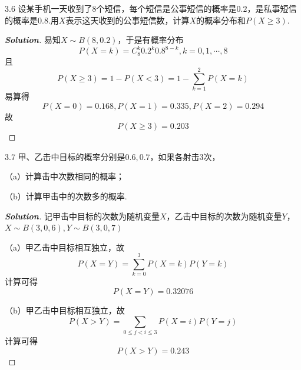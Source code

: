 \documentclass[10pt, a4paper, oneside]{ctexart}
\newenvironment{solution}{\begin{proof}[\bf Solution]}{\end{proof}}
\begin{document}
3.6 设某手机一天收到了$8$个短信，每个短信是公事短信的概率是$0.2$，是私事短信的概率是$0.8$.用$X$表示这天收到的公事短信数，计算$X$的概率分布和$P(X\geqslant 3)$.
\begin{solution}
易知$X\sim B(8,0.2)$，于是有概率分布
\[P(X = k) = C_8^k{0.2^k}{0.8^{8 - k}},k = 0,1, \cdots ,8\]
且
\[P(X \geqslant 3) = 1 - P(X < 3) = 1 - \sum\limits_{k = 1}^2 {P(X = k)} \]
易算得
\[P(X = 0) = 0.168,P(X = 1) = 0.335,P(X = 2) = 0.294\]
故
\[P(X \geqslant 3) = 0.203\]
\end{solution}


3.7 甲、乙击中目标的概率分别是$0.6,0.7$，如果各射击$3$次，

（a）计算击中次数相同的概率；

（b）计算甲击中的次数多的概率.
\begin{solution}
记甲击中目标的次数为随机变量$X$，乙击中目标的次数为随机变量$Y$，$X\sim B(3,0,6),Y\sim B(3,0,7)$

（a）甲乙击中目标相互独立，故
\[P(X = Y) = \sum\limits_{k = 0}^3 {P(X = k)P(Y = k)} \]
计算可得
\[P(X = Y) = 0.32076\]

（b）甲乙击中目标相互独立，故
\[P(X > Y) = \sum\limits_{0 \leqslant j < i \leqslant 3} {P(X = i)P(Y = j)} \]
计算可得
\[P(X > Y) = 0.243\]
\end{solution}
\end{document}
